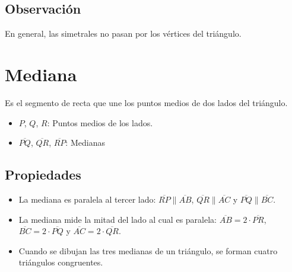 \documentclass{sn-guia}
\begin{document}
\subsection*{Observación}

En general, las simetrales no pasan por los vértices del triángulo.

\section*{Mediana} 
Es el segmento de recta que une los puntos medios de dos lados del triángulo.

\begin{tcolorbox}
    \begin{center}
    \end{center}
    \tcblower
        \begin{itemize}
            \item $P$, $Q$, $R$: Puntos medios de los lados.
            \item $\overline{PQ}$, $\overline{QR}$, $\overline{RP}$: Medianas 
        \end{itemize}
\end{tcolorbox}

\subsection*{Propiedades}
\begin{itemize}
    \item La mediana es paralela al tercer lado: $\overline{RP}\parallel\overline{AB}$, $\overline{QR}\parallel\overline{AC}$ y
    $\overline{PQ}\parallel\overline{BC}$.
    \item La mediana mide la mitad del lado al cual es paralela:
    $\overline{AB}=2\cdot\overline{PR}$, $\overline{BC}=2\cdot\overline{PQ}$ y $\overline{AC}=2\cdot\overline{QR}$.
    \item Cuando se dibujan las tres medianas de un triángulo, se forman cuatro
    triángulos congruentes.
\end{itemize}
\end{document}
